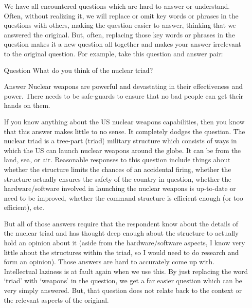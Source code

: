 We have all encountered questions which are hard to answer or understand. Often, without realizing it, we will replace or omit key words or phrases in the questions with others, making the question easier to answer, thinking that we answered the original.  But, often, replacing those key words or phrases in the question makes it a new question all together and makes your answer irrelevant to the original question. For example, take this question and answer pair:

\begin{earg}
\item[Question]What do you think of the nuclear triad? 
\item[Answer]Nuclear weapons are powerful and devastating in their effectiveness and power. There needs to be safe-guards to ensure that no bad people can get their hands on them.
\end{earg}

If you know anything about the US nuclear weapons capabilities, then you know that this answer makes little to no sense. It completely dodges the question. The nuclear triad is a tree-part (triad) military structure which consists of ways in which the US can launch nuclear weapons around the globe. It can be from the land, sea, or air. Reasonable responses to this question include things about whether the structure limits the chances of an accidental firing, whether the structure actually ensures the safety of the country in question, whether the hardware/software involved in launching the nuclear weapons is up-to-date or need to be improved, whether the command structure is efficient enough (or too efficient), etc.

But all of those answers require that the respondent know about the details of the nuclear triad and has thought deep enough about the structure to actually hold an opinion about it (aside from the hardware/software aspects, I know very little about the structures within the triad, so I would need to do research and form an opinion). Those answers are hard to accurately come up with. Intellectual laziness is at fault again when we use this. By just replacing the word `triad' with `weapons' in the question, we get a far easier question which can be very simply answered. But, that question does not relate back to the context or the relevant aspects of the original. 

